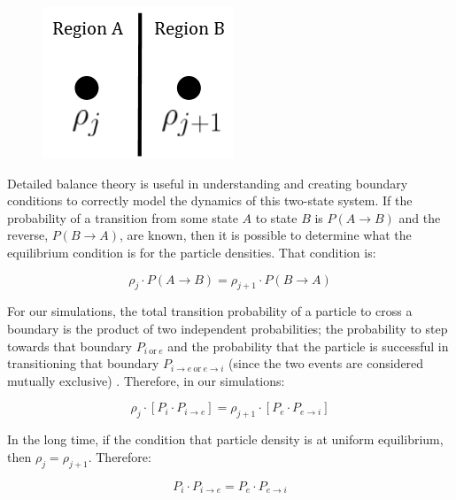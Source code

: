 	\begin{figure}[h]
		\centering
		\includegraphics[width=0.27\linewidth]{../images/balance}
		\caption{}
		\label{fig:balance}
	\end{figure}
 
	

	Detailed balance theory is useful in understanding and creating boundary conditions to correctly model the dynamics of this two-state system. If the probability of a transition from some state $ A $ to state $ B $ is $ P(A \rightarrow B) $ and the reverse, $ P(B \rightarrow A) $, are known, then it is possible to determine what the equilibrium condition is for the particle densities. That condition is:
	
	\begin{equation}
		\rho_{j} \cdot P(A \rightarrow B) = \rho_{j+1} \cdot P(B \rightarrow A)
	\end{equation}
	
	For our simulations, the total transition probability of a particle to cross a boundary is the product of two independent probabilities; the probability to step towards that boundary $ P_{i \: \textrm{or} \: e} $ and the probability that the particle is successful in transitioning that boundary $ P_{i \rightarrow e \: \textrm{or} \: e \rightarrow i} $ (since the two events are considered mutually exclusive) \citep{haan}. Therefore, in our simulations:
	
	\begin{equation}
		\rho_{j} \cdot \left[ P_{i} \cdot P_{i \rightarrow e} \right] = \rho_{j+1} \cdot \left[  P_{e} \cdot P_{e \rightarrow i} \right] 
	\end{equation}
	
	In the long time, if the condition that particle density is at uniform equilibrium, then  $\rho_{j} = \rho_{j+1} $. Therefore:
	
	\begin{equation}
		P_{i} \cdot P_{i \rightarrow e} = P_{e} \cdot P_{e \rightarrow i}
	\end{equation}
	
